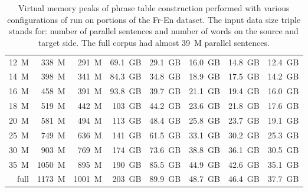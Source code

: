 \begin{table}[!htb]
\begin{tabular}{ | r  r  r | r  r  r  r  r | }
12~M & 338~M & 291~M & 69.1~GB & 29.1~GB & 16.0~GB & 14.8~GB & 12.4~GB \\
14~M & 398~M & 341~M & 84.3~GB & 34.8~GB & 18.9~GB & 17.5~GB & 14.2~GB \\
16~M & 458~M & 391~M & 93.8~GB & 39.7~GB & 21.1~GB & 19.4~GB & 16.0~GB \\
18~M & 519~M & 442~M & 103~GB & 44.2~GB & 23.6~GB & 21.8~GB & 17.6~GB \\
20~M & 581~M & 494~M & 113~GB & 48.4~GB & 25.8~GB & 23.7~GB & 19.1~GB \\
25~M & 749~M & 636~M & 141~GB & 61.5~GB & 33.1~GB & 30.2~GB & 25.3~GB \\
30~M & 903~M & 769~M & 174~GB & 73.6~GB & 38.8~GB & 36.1~GB & 30.5~GB \\
35~M & 1050~M & 895~M & 190~GB & 85.5~GB & 44.9~GB & 42.6~GB & 35.1~GB \\
full & 1173~M & 1001~M & 203~GB & 89.9~GB & 48.7~GB & 46.4~GB & 37.7~GB \\
\hline
\end{tabular}
\caption{\label{fr-en-memory-benchmarking}
Virtual memory peaks of phrase table construction performed with
various configurations of \eppex{} run on portions of the Fr-En dataset.
The input data size triple stands for: number of parallel sentences and number of words on the source and target side.
The full corpus had almost 39~M parallel sentences.}
\end{table}

